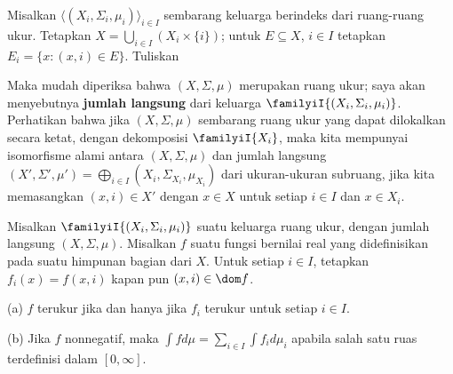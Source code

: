
 Misalkan
$\langle(X_i,\Sigma_i,\mu_i)\rangle_{i\in I}$ sembarang keluarga
berindeks dari ruang-ruang ukur.   Tetapkan
$X=\bigcup_{i\in I}(X_i\times\{i\})$; untuk $E\subseteq X$, $i\in I$
tetapkan $E_i=\{x:(x,i)\in E\}$.   Tuliskan



\noindent Maka mudah diperiksa bahwa $(X,\Sigma,\mu)$ merupakan ruang
ukur; saya akan menyebutnya {\bf jumlah langsung} dari keluarga
$\familyiI{(X_i,\Sigma_i,\mu_i)}$.   Perhatikan bahwa jika
$(X,\Sigma,\mu)$ sembarang ruang ukur yang dapat dilokalkan secara
ketat, dengan dekomposisi $\familyiI{X_i}$, maka kita mempunyai isomorfisme
alami antara $(X,\Sigma,\mu)$ dan jumlah langsung
$(X',\Sigma',\mu')=\bigoplus_{i\in I}(X_i,\Sigma_{X_i},\mu_{X_i})$ dari
ukuran-ukuran subruang, jika kita memasangkan $(x,i)\in X'$ dengan
$x\in X$ untuk setiap $i\in I$ dan $x\in X_i$.


Misalkan $\familyiI{(X_i,\Sigma_i,\mu_i)}$ suatu keluarga ruang ukur,
dengan jumlah langsung $(X,\Sigma,\mu)$.   Misalkan $f$ suatu fungsi
bernilai real yang didefinisikan pada suatu himpunan bagian dari $X$.
Untuk setiap $i\in I$, tetapkan $f_i(x)=f(x,i)$ kapan pun
$(x,i)\in\dom f$.

(a) $f$ terukur jika dan hanya jika $f_i$ terukur untuk setiap $i\in I$.

(b) Jika $f$ nonnegatif, maka
$\int fd\mu=\sum_{i\in I}\int f_id\mu_i$ apabila salah satu ruas
terdefinisi dalam $[0,\infty]$.

